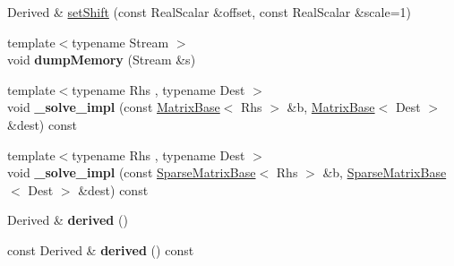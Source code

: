 \begin{DoxyCompactItemize}
\item 
Derived \& \mbox{\hyperlink{class_eigen_1_1_simplicial_cholesky_base_a362352f755101faaac59c1ed9d5e3559}{set\+Shift}} (const Real\+Scalar \&offset, const Real\+Scalar \&scale=1)
\item 
\mbox{\label{class_eigen_1_1_simplicial_cholesky_base_a61efd39e3f15e6864552953bdd4f29c7}} 
{\footnotesize template$<$typename Stream $>$ }\\void {\bfseries dump\+Memory} (Stream \&s)
\item 
\mbox{\label{class_eigen_1_1_simplicial_cholesky_base_a37ab9aaf6c2cbb4cc15ecbba7e424c74}} 
{\footnotesize template$<$typename Rhs , typename Dest $>$ }\\void {\bfseries \+\_\+solve\+\_\+impl} (const \mbox{\hyperlink{class_eigen_1_1_matrix_base}{Matrix\+Base}}$<$ Rhs $>$ \&b, \mbox{\hyperlink{class_eigen_1_1_matrix_base}{Matrix\+Base}}$<$ Dest $>$ \&dest) const
\item 
\mbox{\label{class_eigen_1_1_simplicial_cholesky_base_a64793e46e9815288b9a429cc7b63a6bb}} 
{\footnotesize template$<$typename Rhs , typename Dest $>$ }\\void {\bfseries \+\_\+solve\+\_\+impl} (const \mbox{\hyperlink{class_eigen_1_1_sparse_matrix_base}{Sparse\+Matrix\+Base}}$<$ Rhs $>$ \&b, \mbox{\hyperlink{class_eigen_1_1_sparse_matrix_base}{Sparse\+Matrix\+Base}}$<$ Dest $>$ \&dest) const
\item 
\mbox{\label{class_eigen_1_1_simplicial_cholesky_base_ad213fb2c2199ca597b96f1f79653637f}} 
Derived \& {\bfseries derived} ()
\item 
\mbox{\label{class_eigen_1_1_simplicial_cholesky_base_af5f23a7e048060c3082c5a1ddfa91932}} 
const Derived \& {\bfseries derived} () const
\end{DoxyCompactItemize}
